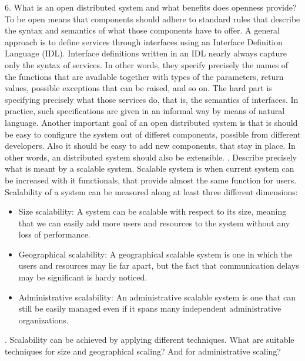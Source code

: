 \documentclass[12pt,a4paper]{report}
\begin{document}
6. What is an open distributed system and what benefits does openness provide?
To be open means that components should adhere to standard rules that describe the syntax and semantics of what those components have to offer. A general approach is to define services through interfaces using an Interface Definition Language (IDL). Interface definitions written in an IDL nearly always capture only the syntax of services. In other words, they specify precisely the names of the functions that are available together with types of the parameters, return values, possible exceptions that can be raised, and so on. The hard part is specifying precisely what those services do, that is, the semantics of interfaces. In practice, such specifications are given in an informal way by means of natural language.
Another important goal of an open distributed system is that is should be easy to configure the system out of differet components, possible from different developers. Also it should be easy to add new components, that stay in place. In other words, an distributed system should also be extensible.
. Describe precisely what is meant by a scalable system.
Scalable system is when current system can be increased with it functionals, that provide almost the same function for users.
Scalability of a system can be measured along at least three different dimensions:
\begin{itemize}
	\item{Size scalability: A system can be scalable with respect to its size, meaning that we can easily add more users and resources to the system without any loss of performance.}
	\item{Geographical scalability: A geographical scalable system is one in which the users and resources may lie far apart, but the fact that communication delays may be significant is hardy noticed.}

	\item{Administrative scalability: An administrative scalable system is one that can still be easily managed even if it spans many independent administrative organizations.}
\end{itemize}
. Scalability can be achieved by applying different techniques. What are suitable techniques for size and geographical scaling? And for administrative scaling?
\end{document}
